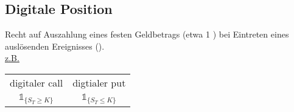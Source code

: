 
\subsection{Digitale Position}
\label{sub: digitale_position}
Recht auf Auszahlung eines festen Geldbetrags (etwa 1 \texteuro) bei Eintreten eines auslösenden Ereignisses ().\\
\uline{z.B.}\\
\begin{tabular}{c c}
	digitaler call & digtialer put\\
	$\mathbb{1}_{\{S_T\ge K\}}$ & $\mathbb{1}_{\{S_T\le K \}}$ \\
\end{tabular}


